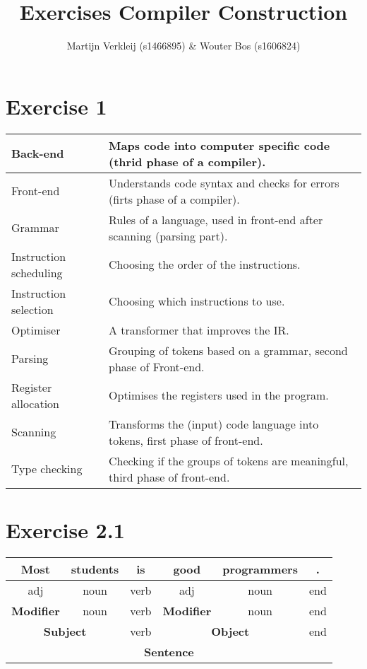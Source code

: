 \documentclass[11pt]{article} %
\title{Exercises Compiler Construction}
\author{Martijn Verkleij (s1466895) \& Wouter Bos (s1606824)}
\begin{document}
\maketitle

\section*{Exercise 1}
\begin{tabular}{l|p{10cm}}\hline
Back-end
& Maps code into computer specific code (thrid phase of a compiler). \\\hline

Front-end
& Understands code syntax and checks for errors (firts phase of a compiler). \\\hline

Grammar
& Rules of a language, used in front-end after scanning (parsing part). \\\hline

Instruction scheduling
& Choosing the order of the instructions. \\\hline

Instruction selection
& Choosing which instructions to use. \\\hline

Optimiser
& A transformer that improves the IR. \\\hline

Parsing
& Grouping of tokens based on a grammar, second phase of Front-end. \\\hline

Register allocation
& Optimises the registers used in the program. \\\hline

Scanning
& Transforms the (input) code language into tokens, first phase of front-end. \\\hline

Type checking
& Checking if the groups of tokens are meaningful, third phase of front-end. \\\hline

\end{tabular}


\section*{Exercise 2.1}
\begin{tabular}{|c|c|c|c|c|c|}	\hline
Most 				& students 			& is 	& good 					& programmers 	& . 		\\\hline
adj 				& noun 				& verb 	& adj 					& noun 			& end 		\\\hline
\textbf{Modifier}	& noun				& verb	& \textbf{Modifier}		& noun			& end		\\\hline
\multicolumn{2}{|c|}{\textbf{Subject}}	& verb 	& \multicolumn{2}{c|}{\textbf{Object}}	& end		\\\hline
\multicolumn{6}{|c|}{\textbf{Sentence}}																\\\hline
\end{tabular}
\end{document}
